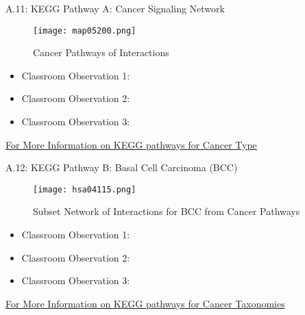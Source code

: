 \begin{alertblock}{A.11: KEGG Pathway A: Cancer Signaling Network}
	\vspace{6pt}
	\begin{figure}[H]
		\begin{minipage}[c]{1\linewidth}
			\texttt{[image: map05200.png]}
			\caption{Cancer Pathways of Interactions}
		\end{minipage}%
	\end{figure}
	\vspace{6pt}
	\begin{itemize}
		\item Classroom Observation 1:
		\item Classroom Observation 2:
		\item Classroom Observation 3:
	\end{itemize}
	\vspace{6pt}
\href{http://www.genome.jp/kegg/}{For More Information on KEGG pathways for Cancer Type}
\end{alertblock}
\vspace{6pt}
\begin{alertblock}{A.12: KEGG Pathway B: Basal Cell Carcinoma (BCC)}
\vspace{6pt}
\begin{figure}[H]
\begin{minipage}[c]{1\linewidth}
\texttt{[image: hsa04115.png]}
\caption{Subset Network of Interactions for BCC from Cancer Pathways}
\end{minipage}%
\end{figure}
\vspace{6pt}
\begin{itemize}
	\item Classroom Observation 1:
	\item Classroom Observation 2:
	\item Classroom Observation 3:
\end{itemize}
	\vspace{6pt}
\href{http://www.genome.jp/kegg/}{For More Information on KEGG pathways for Cancer Taxonomies}
\end{alertblock}
